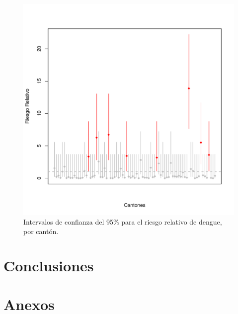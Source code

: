 \documentclass[12pt,a4paper]{article}
\begin{document}
\begin{figure}[h]
\centering
\includegraphics[scale=0.75]{F6.pdf}
\caption{Intervalos de confianza del 95\% para el riesgo relativo de dengue, por cantón.}
\end{figure}

\section{Conclusiones}

\section{Anexos}
\end{document}
